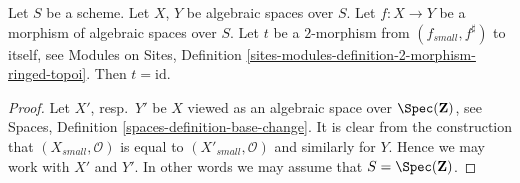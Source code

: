 \begin{lemma}
\label{lemma-2-morphism}
Let $S$ be a scheme.
Let $X$, $Y$ be algebraic spaces over $S$.
Let $f : X \to Y$ be a morphism of algebraic spaces over $S$.
Let $t$ be a $2$-morphism from $(f_{small}, f^\sharp)$ to itself, see
Modules on Sites,
Definition \ref{sites-modules-definition-2-morphism-ringed-topoi}.
Then $t = \text{id}$.
\end{lemma}

\begin{proof}
Let $X'$, resp.\ $Y'$ be $X$ viewed as an algebraic space over
$\Spec(\mathbf{Z})$, see
Spaces, Definition \ref{spaces-definition-base-change}.
It is clear from the construction that $(X_{small}, \mathcal{O})$
is equal to $(X'_{small}, \mathcal{O})$ and similarly for $Y$.
Hence we may work with $X'$ and $Y'$. In other words we may
assume that $S = \Spec(\mathbf{Z})$.


\end{proof}
